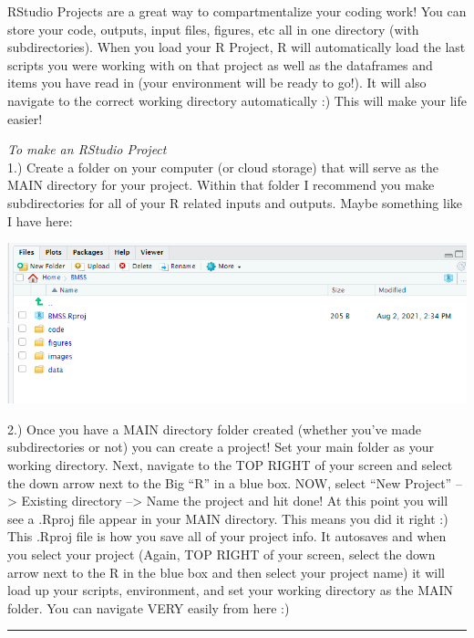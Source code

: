\documentclass[
  letterpaper,
  DIV=11,
  numbers=noendperiod]{scrartcl}
\begin{document}
RStudio Projects are a great way to compartmentalize your coding work!
You can store your code, outputs, input files, figures, etc all in one
directory (with subdirectories). When you load your R Project, R will
automatically load the last scripts you were working with on that
project as well as the dataframes and items you have read in (your
environment will be ready to go!). It will also navigate to the correct
working directory automatically :) This will make your life easier!

\emph{To make an RStudio Project}\\
1.) Create a folder on your computer (or cloud storage) that will serve
as the MAIN directory for your project. Within that folder I recommend
you make subdirectories for all of your R related inputs and outputs.
Maybe something like I have here:

\includegraphics{images/projectex.png}

2.) Once you have a MAIN directory folder created (whether you've made
subdirectories or not) you can create a project! Set your main folder as
your working directory. Next, navigate to the TOP RIGHT of your screen
and select the down arrow next to the Big ``R'' in a blue box. NOW,
select ``New Project'' --\textgreater{} Existing directory
--\textgreater{} Name the project and hit done! At this point you will
see a .Rproj file appear in your MAIN directory. This means you did it
right :) This .Rproj file is how you save all of your project info. It
autosaves and when you select your project (Again, TOP RIGHT of your
screen, select the down arrow next to the R in the blue box and then
select your project name) it will load up your scripts, environment, and
set your working directory as the MAIN folder. You can navigate VERY
easily from here :)

\begin{center}\rule{0.5\linewidth}{0.5pt}\end{center}
\end{document}
